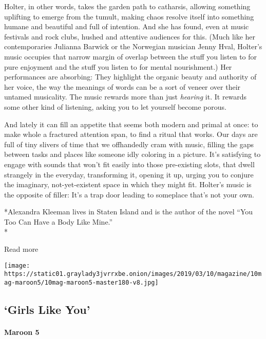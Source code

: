 Holter, in other words, takes the garden path to catharsis, allowing
something uplifting to emerge from the tumult, making chaos resolve
itself into something humane and beautiful and full of intention. And
she has found, even at music festivals and rock clubs, hushed and
attentive audiences for this. (Much like her contemporaries Julianna
Barwick or the Norwegian musician Jenny Hval, Holter's music occupies
that narrow margin of overlap between the stuff you listen to for pure
enjoyment and the stuff you listen to for mental nourishment.) Her
performances are absorbing: They highlight the organic beauty and
authority of her voice, the way the meanings of words can be a sort of
veneer over their untamed musicality. The music rewards more than just
\emph{hearing} it. It rewards some other kind of listening, asking you
to let yourself become porous.

And lately it can fill an appetite that seems both modern and primal at
once: to make whole a fractured attention span, to find a ritual that
works. Our days are full of tiny slivers of time that we offhandedly
cram with music, filling the gaps between tasks and places like someone
idly coloring in a picture. It's satisfying to engage with sounds that
won't fit easily into those pre-existing slots, that dwell strangely in
the everyday, transforming it, opening it up, urging you to conjure the
imaginary, not-yet-existent space in which they might fit. Holter's
music is the opposite of filler: It's a trap door leading to someplace
that's not your own.

*Alexandra Kleeman lives in Staten Island and is the author of the novel
``You Too Can Have a Body Like Mine.''\\
*

Read more

\texttt{[image: https://static01.graylady3jvrrxbe.onion/images/2019/03/10/magazine/10mag-maroon5/10mag-maroon5-master180-v8.jpg]}

\hypertarget{--girls-like-you}{%
\subsection{\texorpdfstring{ `Girls Like
You'}{  `Girls Like You'}}\label{--girls-like-you}}

\hypertarget{maroon-5}{%
\paragraph{Maroon 5}\label{maroon-5}}

